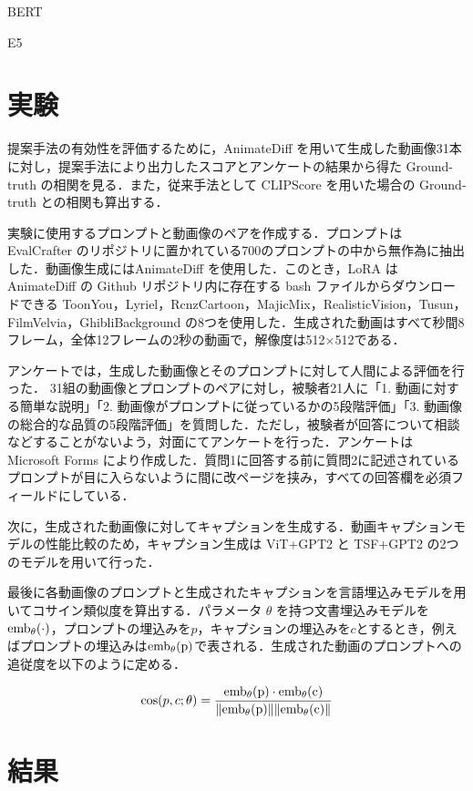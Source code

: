 \documentclass[10pt]{article}
\begin{document}
BERT \cite{devlin2018bert}

E5 \cite{wang2022e5}

\section{実験}

提案手法の有効性を評価するために，AnimateDiff を用いて生成した動画像31本に対し，提案手法により出力したスコアとアンケートの結果から得た Ground-truth の相関を見る．また，従来手法として CLIPScore \cite{hessel2021clipscore} を用いた場合の Ground-truth との相関も算出する．

実験に使用するプロンプトと動画像のペアを作成する．プロンプトは EvalCrafter \cite{liu2023evalcrafter} のリポジトリに置かれている700のプロンプトの中から無作為に抽出した．動画像生成にはAnimateDiff \cite{guo2023animatediff} を使用した．このとき，LoRA は AnimateDiff の Github リポジトリ内に存在する bash ファイルからダウンロードできる ToonYou，Lyriel，RcnzCartoon，MajicMix，RealisticVision，Tusun，FilmVelvia，GhibliBackground の8つを使用した．生成された動画はすべて秒間8フレーム，全体12フレームの2秒の動画で，解像度は512$\times$512である．

アンケートでは，生成した動画像とそのプロンプトに対して人間による評価を行った． 31組の動画像とプロンプトのペアに対し，被験者21人に「1. 動画に対する簡単な説明」「2. 動画像がプロンプトに従っているかの5段階評価」「3. 動画像の総合的な品質の5段階評価」を質問した．ただし，被験者が回答について相談などすることがないよう，対面にてアンケートを行った．アンケートは Microsoft Forms により作成した．質問1に回答する前に質問2に記述されているプロンプトが目に入らないように間に改ページを挟み，すべての回答欄を必須フィールドにしている．

次に，生成された動画像に対してキャプションを生成する．動画キャプションモデルの性能比較のため，キャプション生成は ViT+GPT2 \cite{vit+gpt2} と TSF+GPT2 \cite{tsf+gpt2} の2つのモデルを用いて行った．

最後に各動画像のプロンプトと生成されたキャプションを言語埋込みモデルを用いてコサイン類似度を算出する．パラメータ $\theta$ を持つ文書埋込みモデルを$\rm{emb}_\theta(\cdot)$，プロンプトの埋込みを$p$，キャプションの埋込みを$c$とするとき，例えばプロンプトの埋込みは$\rm{emb}_\theta(p)$で表される．生成された動画のプロンプトへの追従度を以下のように定める．

$$\cos(p,c;\theta)=\frac{\rm{emb}_\theta(p)\cdot \rm{emb}_\theta(c)}{\|\rm{emb}_\theta(p)\|\|\rm{emb}_\theta(c)\|}$$

\section{結果}
\end{document}
